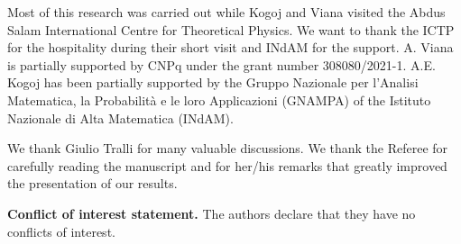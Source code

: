 \documentclass[12pt]{amsart}
\begin{document}
Most of this research was carried out while Kogoj and Viana visited the Abdus Salam International Centre for Theoretical Physics. We want to thank the ICTP for the hospitality during their short visit and INdAM for the support. A. Viana is partially supported by CNPq under the grant number 308080/2021-1. A.E. Kogoj has been partially supported by the Gruppo Nazionale per l'Analisi Matematica, la Probabilit\`a e le loro Applicazioni (GNAMPA) of the Istituto Nazionale di Alta Matematica (INdAM). 

We thank Giulio Tralli for many valuable discussions.  We thank the Referee for carefully reading the manuscript
and for her/his remarks that greatly improved the presentation of our results.


\vspace{12pt}\noindent
{\bf Conflict of interest statement.}
The authors declare that they have no conflicts of interest.

%
%


\end{document}
